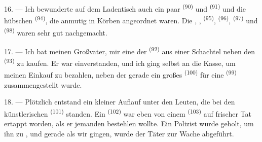 16. --- Ich bewunderte auf dem Ladentisch auch ein paar 
\textsuperscript{(90)} und  \textsuperscript{(91)} und die
hübschen  \textsuperscript{(94)}, die anmutig in Körben
angeordnet waren. Die , ,
 \textsuperscript{(95)}, 
\textsuperscript{(96)},  \textsuperscript{(97)} und
 \textsuperscript{(98)} waren sehr gut nachgemacht.

\VUsaut{4.4mm}
\VUsaut{2.8mm}

17. --- Ich bat meinen Großvater, mir eine der 
\textsuperscript{(92)} aus einer Schachtel neben den 
\textsuperscript{(93)} zu kaufen. Er war einverstanden, und ich ging selbst an die
Kasse, um meinen Einkauf zu bezahlen, neben der gerade ein großes 
\textsuperscript{(100)} für eine  \textsuperscript{(99)}
zusammengestellt wurde.

18. --- Plötzlich entstand ein kleiner Auflauf unter den Leuten, die bei den
künstlerischen  \textsuperscript{(101)} standen. Ein 
\textsuperscript{(102)} war eben von einem 
\textsuperscript{(103)} auf frischer Tat ertappt worden, als er jemanden bestehlen
wollte. Ein Polizist wurde geholt, um ihn zu , und gerade als wir
gingen, wurde der Täter zur Wache abgeführt.
\VUsaut{6.0mm}
\VUfilet{22mm}
